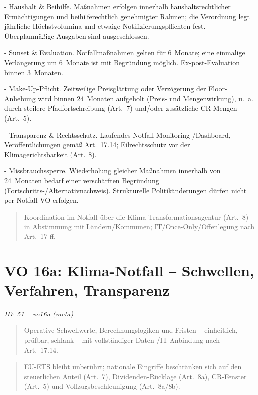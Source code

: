 \documentclass[12pt,a4paper]{scrartcl}
\begin{document}
- Haushalt \& Beihilfe. Maßnahmen erfolgen innerhalb haushaltsrechtlicher Ermächtigungen und beihilferechtlich genehmigter Rahmen; die Verordnung legt jährliche Höchstvolumina und etwaige Notifizierungspflichten fest. Überplanmäßige Ausgaben sind ausgeschlossen.

- Sunset \& Evaluation. Notfallmaßnahmen gelten für 6 Monate; eine einmalige Verlängerung um 6 Monate ist mit Begründung möglich. Ex-post-Evaluation binnen 3 Monaten.

- Make-Up-Pflicht. Zeitweilige Preisglättung oder Verzögerung der Floor-Anhebung wird binnen 24 Monaten aufgeholt (Preis- und Mengenwirkung), u. a. durch steilere Pfadfortschreibung (Art. 7) und/oder zusätzliche CR-Mengen (Art. 5).

- Transparenz \& Rechtsschutz. Laufendes Notfall-Monitoring-/Dashboard, Veröffentlichungen gemäß Art. 17.14; Eilrechtsschutz vor der Klimagerichtsbarkeit (Art. 8).

- Missbrauchssperre. Wiederholung gleicher Maßnahmen innerhalb von 24 Monaten bedarf einer verschärften Begründung (Fortschritts-/Alternativnachweis). Strukturelle Politikänderungen dürfen nicht per Notfall-VO erfolgen.

{\footnotesize\begin{quote}
Koordination im Notfall über die Klima-Transformationsagentur (Art. 8) in Abstimmung mit Ländern/Kommunen; IT/Once-Only/Offenlegung nach Art. 17 ff.
\end{quote}}



\section[VO 16a: Klima-Notfall -- Schwellen, Verfahren, Transparenz]{VO 16a: Klima-Notfall -- Schwellen, Verfahren, Transparenz}
\noindent\textit{ID: 51 -- vo16a (meta)}

\begin{quote}
Operative Schwellwerte, Berechnungslogiken und Fristen -- einheitlich, prüfbar, schlank -- mit vollständiger Daten-/IT-Anbindung nach Art. 17.14.
\end{quote}

{\footnotesize\begin{quote}
EU-ETS bleibt unberührt; nationale Eingriffe beschränken sich auf den steuerlichen Anteil (Art. 7), Dividenden-Rücklage (Art. 8a), CR-Fenster (Art. 5) und Vollzugsbeschleunigung (Art. 8a/8b).
\end{quote}}
\end{document}
